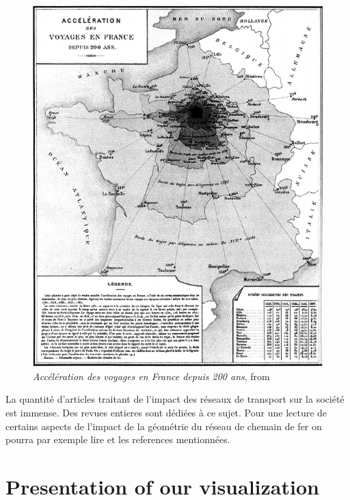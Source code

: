 \documentclass{vgtc}                          %
\begin{document}
\begin{figure}[h]
 \centering %
 \includegraphics[scale=1, width=\columnwidth]{Fig-15-Anamorphic-map-Acceleration-of-Travel-in-France-over-200-Years-Acceleration}
 \caption{\textit{Acc\'el\'eration des voyages en France depuis 200 ans}, from \cite{Cheysson} }
 \label{fig:sample}
\end{figure}




La quantité d'articles traitant de l'impact des réseaux de transport sur la société est immense. Des revues entieres sont dédiées à ce sujet. Pour une lecture de certains aspects de l'impact de la géométrie du réseau de chemain de fer on pourra par exemple lire \cite{cao2017investigating} et les references mentionnées.


\section{Presentation of our visualization}
\end{document}
